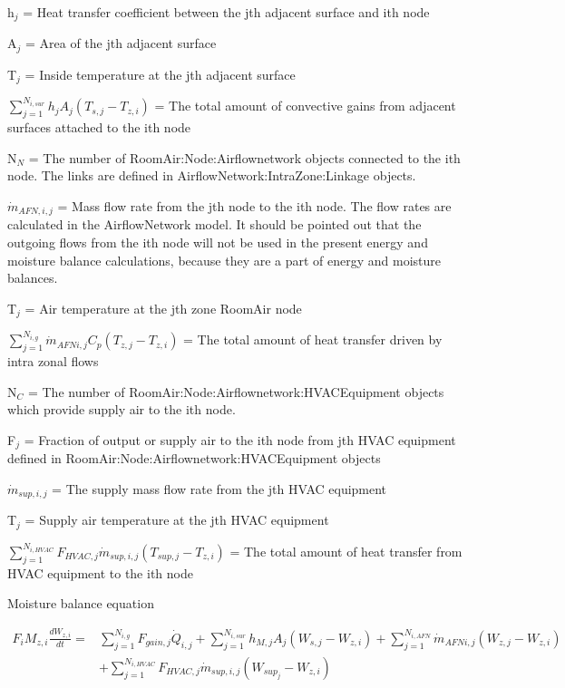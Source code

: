 h\(_{j}\) = Heat transfer coefficient between the jth adjacent surface and ith node

A\(_{j}\) = Area of the jth adjacent surface

T\(_{j}\) = Inside temperature at the jth adjacent surface

\({\sum\limits_{j = 1}^{N_{i,sur}} h_{j} A_j \left( T_{s,j} - T_{z,i}\right)}\) = The total amount of convective gains from adjacent surfaces attached to the ith node

N\(_{N}\) = The number of RoomAir:Node:Airflownetwork objects connected to the ith node. The links are defined in AirflowNetwork:IntraZone:Linkage objects.

\({\dot m}_{AFN,i,j}\) = Mass flow rate from the jth node to the ith node. The flow rates are calculated in the AirflowNetwork model. It should be pointed out that the outgoing flows from the ith node will not be used in the present energy and moisture balance calculations, because they are a part of energy and moisture balances.

T\(_{j}\) = Air temperature at the jth zone RoomAir node

\({\sum\limits_{j = 1}^{N_{i,g}} \dot m_{AFN i,j} {C_p}\left( T_{z,j} - T_{z,i} \right)}\) = The total amount of heat transfer driven by intra zonal flows

N\(_{C}\) = The number of RoomAir:Node:Airflownetwork:HVACEquipment objects which provide supply air to the ith node.

F\(_{j}\) = Fraction of output or supply air to the ith node from jth HVAC equipment defined in RoomAir:Node:Airflownetwork:HVACEquipment objects

\({\dot m}_{sup,i,j}\) = The supply mass flow rate from the jth HVAC equipment

T\(_{j}\) = Supply air temperature at the jth HVAC equipment

\({\sum\limits_{j = 1}^{N_{i,HVAC}} F_{HVAC,j} \dot m_{sup,i,j} \left( T_{sup,j} - T_{z,i}\right)}\) = The total amount of heat transfer from HVAC equipment to the ith node

Moisture balance equation

\begin{equation}
\begin{split}
{F_i}{M_{z,i}}\frac{{d{W_{z,i}}}}{{dt}} =& \sum\limits_{j = 1}^{{N_{i,g}}} {{F_{gain,j}{\dot Q}_{i,j}}}  + \sum\limits_{j = 1}^{{N_{i,sur}}} {{h_{M,j}}} {A_j}\left( {{W_{s,j}} - {W_{z,i}}} \right) + \sum\limits_{j = 1}^{{N_{i,AFN}}} {{{\dot m}_{AFN i,j}}} \left( {{W_{z,j}} - {W_{z,i}}} \right)\, \\
&+ \sum\limits_{j = 1}^{{N_{i,HVAC}}} {{{F_{HVAC,j}}{\dot m}_{sup,i,j}}} \left( {{W_{sup_j}} - {W_{z,i}}} \right)
\end{split}
\end{equation}

